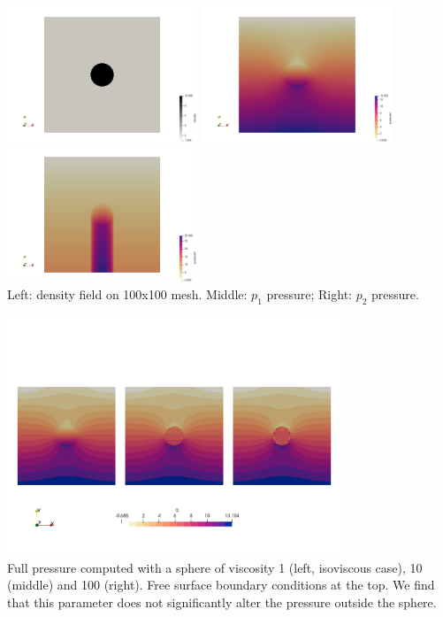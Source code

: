 \begin{center}
\includegraphics[width=5.7cm]{python_codes/fieldstone_119/results/exp5/rho}
\includegraphics[width=5.7cm]{python_codes/fieldstone_119/results/exp5/p1}
\includegraphics[width=5.7cm]{python_codes/fieldstone_119/results/exp5/p2}\\
{\captionfont Left: density field on 100x100 mesh. Middle: $p_1$ pressure; Right: $p_2$ pressure.} 
\end{center}

\begin{center}
\includegraphics[width=10cm]{python_codes/fieldstone_119/results/exp5/q_viscs}\\
{\captionfont Full pressure computed with a sphere of viscosity 1 (left, isoviscous case), 
10 (middle) and 100 (right). Free surface boundary conditions at the top. 
We find that this parameter does not significantly alter the pressure outside the sphere.}
\end{center}


